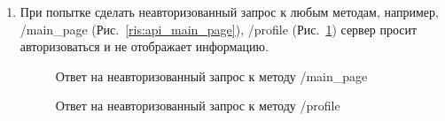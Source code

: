 \documentclass{../includes/TechDoc}
\begin{document}
    \begin{enumerate}
        \item При попытке сделать неавторизованный запрос к любым методам, например, /main\_page (Рис.~\ref{ris:api_main_page}), /profile (Рис.~\ref{ris:api_profile}) сервер просит авторизоваться и не отображает информацию.
        \begin{figure}[h]
            \begin{center}
                \begin{minipage}[h]{0.49\linewidth}
                    \caption{Ответ на неавторизованный запрос к методу /main\_page} %
                    \label{ris:api_main_page} %
                \end{minipage}
                \hfill
                \begin{minipage}[h]{0.49\linewidth}
                    \caption{Ответ на неавторизованный запрос к методу /profile}
                    \label{ris:api_profile}
                \end{minipage}
            \end{center}
        \end{figure}


\end{enumerate}
\end{document}

